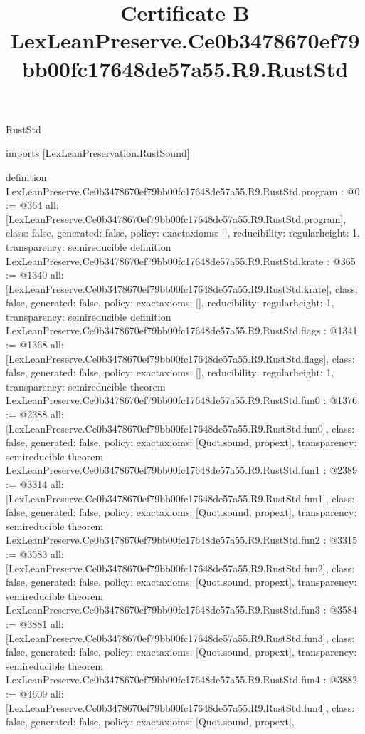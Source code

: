 \begin{lexlean}{RustStd}
\title{Certificate B LexLeanPreserve.Ce0b3478670ef79bb00fc17648de57a55.R9.RustStd}
\begin{coremodule}
imports [LexLeanPreservation.RustSound]

definition LexLeanPreserve.Ce0b3478670ef79bb00fc17648de57a55.R9.RustStd.program : @0 := @364 {
  all: [LexLeanPreserve.Ce0b3478670ef79bb00fc17648de57a55.R9.RustStd.program],
  class: false,
  generated: false,
  policy: exact{axioms: []},
  reducibility: regular{height: 1},
  transparency: semireducible
}
definition LexLeanPreserve.Ce0b3478670ef79bb00fc17648de57a55.R9.RustStd.krate : @365 := @1340 {
  all: [LexLeanPreserve.Ce0b3478670ef79bb00fc17648de57a55.R9.RustStd.krate],
  class: false,
  generated: false,
  policy: exact{axioms: []},
  reducibility: regular{height: 1},
  transparency: semireducible
}
definition LexLeanPreserve.Ce0b3478670ef79bb00fc17648de57a55.R9.RustStd.flags : @1341 := @1368 {
  all: [LexLeanPreserve.Ce0b3478670ef79bb00fc17648de57a55.R9.RustStd.flags],
  class: false,
  generated: false,
  policy: exact{axioms: []},
  reducibility: regular{height: 1},
  transparency: semireducible
}
theorem LexLeanPreserve.Ce0b3478670ef79bb00fc17648de57a55.R9.RustStd.fun0 : @1376 := @2388 {
  all: [LexLeanPreserve.Ce0b3478670ef79bb00fc17648de57a55.R9.RustStd.fun0],
  class: false,
  generated: false,
  policy: exact{axioms: [Quot.sound, propext]},
  transparency: semireducible
}
theorem LexLeanPreserve.Ce0b3478670ef79bb00fc17648de57a55.R9.RustStd.fun1 : @2389 := @3314 {
  all: [LexLeanPreserve.Ce0b3478670ef79bb00fc17648de57a55.R9.RustStd.fun1],
  class: false,
  generated: false,
  policy: exact{axioms: [Quot.sound, propext]},
  transparency: semireducible
}
theorem LexLeanPreserve.Ce0b3478670ef79bb00fc17648de57a55.R9.RustStd.fun2 : @3315 := @3583 {
  all: [LexLeanPreserve.Ce0b3478670ef79bb00fc17648de57a55.R9.RustStd.fun2],
  class: false,
  generated: false,
  policy: exact{axioms: [Quot.sound, propext]},
  transparency: semireducible
}
theorem LexLeanPreserve.Ce0b3478670ef79bb00fc17648de57a55.R9.RustStd.fun3 : @3584 := @3881 {
  all: [LexLeanPreserve.Ce0b3478670ef79bb00fc17648de57a55.R9.RustStd.fun3],
  class: false,
  generated: false,
  policy: exact{axioms: [Quot.sound, propext]},
  transparency: semireducible
}
theorem LexLeanPreserve.Ce0b3478670ef79bb00fc17648de57a55.R9.RustStd.fun4 : @3882 := @4609 {
  all: [LexLeanPreserve.Ce0b3478670ef79bb00fc17648de57a55.R9.RustStd.fun4],
  class: false,
  generated: false,
  policy: exact{axioms: [Quot.sound, propext]},
}
\end{coremodule}
\end{lexlean}
